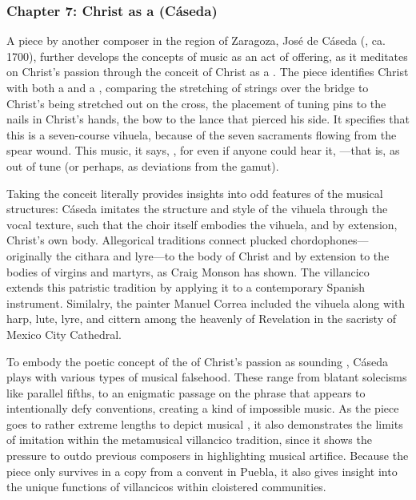 \documentclass{vcbook-proposal}
\begin{document}
\subsubsection{Chapter 7: Christ as a  (Cáseda)}

A piece by another composer in the region of Zaragoza, José de Cáseda (, ca. 1700), further develops the concepts of music as an act of offering, as it meditates on Christ's passion through the conceit of Christ as a . 
The piece identifies Christ with both a  and a , comparing the stretching of strings over the bridge to Christ's being stretched out on the cross, the placement of tuning pins to the nails in Christ's hands, the bow to the lance that pierced his side.
It specifies that this is a seven-course vihuela, because of the seven sacraments flowing from the spear wound.
This music, it says, , for even if anyone could hear it, ---that is, as out of tune (or perhaps, as  deviations from the gamut). 

Taking the conceit literally provides insights into odd features of the musical structures: Cáseda imitates the structure and style of the vihuela through the vocal texture, such that the choir itself embodies the vihuela, and by extension, Christ's own body.
Allegorical traditions connect plucked chordophones---originally the cithara and lyre---to the body of Christ and by extension to the bodies of virgins and martyrs, as Craig Monson has shown.
The villancico extends this patristic tradition by applying it to a contemporary Spanish instrument.
Similalry, the painter Manuel Correa included the vihuela along with harp, lute, lyre, and cittern among the heavenly  of Revelation in the sacristy of Mexico City Cathedral.

To embody the poetic concept of the  of Christ's passion as sounding , Cáseda plays with various types of musical falsehood.
These range from blatant solecisms like parallel fifths, to an enigmatic passage on the phrase  that appears to intentionally defy  conventions, creating a kind of impossible music.
As the piece goes to rather extreme lengths to depict musical , it also demonstrates the limits of imitation within the metamusical villancico tradition, since it shows the pressure to outdo previous composers in highlighting musical artifice.
Because the piece only survives in a copy from a convent in Puebla, it also gives insight into the unique functions of villancicos within cloistered communities.
\end{document}
